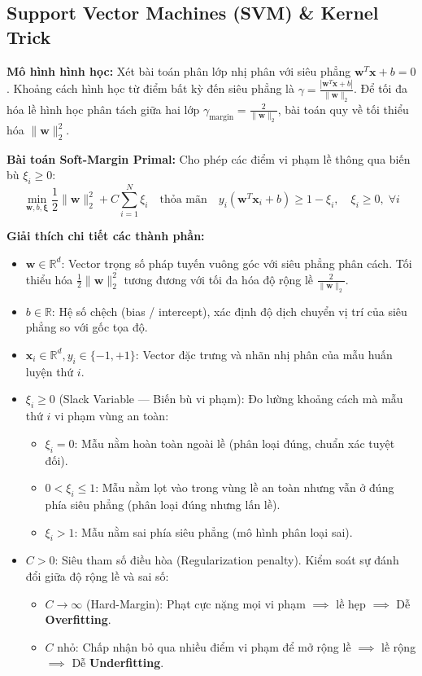\documentclass[10pt,a4paper]{article}
\begin{document}
\subsection{Support Vector Machines (SVM) \& Kernel Trick}
\textbf{Mô hình hình học:} Xét bài toán phân lớp nhị phân với siêu phẳng $\mathbf{w}^T \mathbf{x} + b = 0$. Khoảng cách hình học từ điểm bất kỳ đến siêu phẳng là $\gamma = \frac{|\mathbf{w}^T \mathbf{x} + b|}{\|\mathbf{w}\|_2}$. Để tối đa hóa lề hình học phân tách giữa hai lớp $\gamma_{\text{margin}} = \frac{2}{\|\mathbf{w}\|_2}$, bài toán quy về tối thiểu hóa $\|\mathbf{w}\|_2^2$.

\textbf{Bài toán Soft-Margin Primal:} Cho phép các điểm vi phạm lề thông qua biến bù $\xi_i \ge 0$:
\begin{equation}
    \min_{\mathbf{w}, b, \boldsymbol{\xi}} \frac{1}{2} \|\mathbf{w}\|_2^2 + C \sum_{i=1}^N \xi_i \quad \text{thỏa mãn} \quad y_i(\mathbf{w}^T \mathbf{x}_i + b) \ge 1 - \xi_i, \quad \xi_i \ge 0, \; \forall i
\end{equation}

\textbf{Giải thích chi tiết các thành phần:}
\begin{itemize}[leftmargin=*]
    \item $\mathbf{w} \in \mathbb{R}^d$: Vector trọng số pháp tuyến vuông góc với siêu phẳng phân cách. Tối thiểu hóa $\frac{1}{2}\|\mathbf{w}\|_2^2$ tương đương với tối đa hóa độ rộng lề $\frac{2}{\|\mathbf{w}\|_2}$.
    \item $b \in \mathbb{R}$: Hệ số chệch (bias / intercept), xác định độ dịch chuyển vị trí của siêu phẳng so với gốc tọa độ.
    \item $\mathbf{x}_i \in \mathbb{R}^d, y_i \in \{-1, +1\}$: Vector đặc trưng và nhãn nhị phân của mẫu huấn luyện thứ $i$.
    \item $\xi_i \ge 0$ (Slack Variable --- Biến bù vi phạm): Đo lường khoảng cách mà mẫu thứ $i$ vi phạm vùng an toàn:
    \begin{itemize}
        \item $\xi_i = 0$: Mẫu nằm hoàn toàn ngoài lề (phân loại đúng, chuẩn xác tuyệt đối).
        \item $0 < \xi_i \le 1$: Mẫu nằm lọt vào trong vùng lề an toàn nhưng vẫn ở đúng phía siêu phẳng (phân loại đúng nhưng lấn lề).
        \item $\xi_i > 1$: Mẫu nằm sai phía siêu phẳng (mô hình phân loại sai).
    \end{itemize}
    \item $C > 0$: Siêu tham số điều hòa (Regularization penalty). Kiểm soát sự đánh đổi giữa độ rộng lề và sai số:
    \begin{itemize}
        \item $C \to \infty$ (Hard-Margin): Phạt cực nặng mọi vi phạm $\implies$ lề hẹp $\implies$ Dễ \textbf{Overfitting}.
        \item $C$ nhỏ: Chấp nhận bỏ qua nhiều điểm vi phạm để mở rộng lề $\implies$ lề rộng $\implies$ Dễ \textbf{Underfitting}.
    \end{itemize}
\end{itemize}
\end{document}
